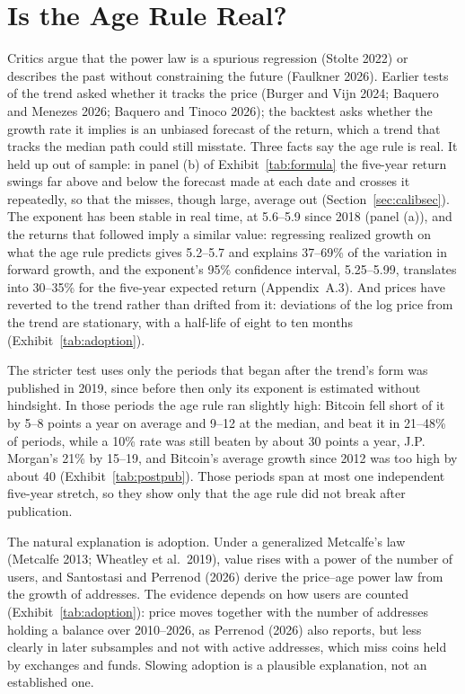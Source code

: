 \documentclass[12pt]{article}
\theoremstyle{plain}
\theoremstyle{remark}
\begin{document}
\section{Is the Age Rule Real?}\label{sec:formula}

Critics argue that the power law is a spurious regression (Stolte 2022) or describes the past without constraining the future (Faulkner 2026). Earlier tests of the trend asked whether it tracks the price (Burger and Vijn 2024; Baquero and Menezes 2026; Baquero and Tinoco 2026); the backtest asks whether the growth rate it implies is an unbiased forecast of the return, which a trend that tracks the median path could still misstate. Three facts say the age rule is real. It held up out of sample: in panel (b) of Exhibit~\ref{tab:formula} the five-year return swings far above and below the forecast made at each date and crosses it repeatedly, so that the misses, though large, average out (Section~\ref{sec:calibsec}). The exponent has been stable in real time, at 5.6--5.9 since 2018 (panel (a)), and the returns that followed imply a similar value: regressing realized growth on what the age rule predicts gives 5.2--5.7 and explains 37--69\% of the variation in forward growth, and the exponent's 95\% confidence interval, 5.25--5.99, translates into 30--35\% for the five-year expected return (Appendix~A.3). And prices have reverted to the trend rather than drifted from it: deviations of the log price from the trend are stationary, with a half-life of eight to ten months (Exhibit~\ref{tab:adoption}).

The stricter test uses only the periods that began after the trend's form was published in 2019, since before then only its exponent is estimated without hindsight. In those periods the age rule ran slightly high: Bitcoin fell short of it by 5--8 points a year on average and 9--12 at the median, and beat it in 21--48\% of periods, while a 10\% rate was still beaten by about 30 points a year, J.P. Morgan's 21\% by 15--19, and Bitcoin's average growth since 2012 was too high by about 40 (Exhibit~\ref{tab:postpub}). Those periods span at most one independent five-year stretch, so they show only that the age rule did not break after publication.

The natural explanation is adoption. Under a generalized Metcalfe's law (Metcalfe 2013; Wheatley et al.\ 2019), value rises with a power of the number of users, and Santostasi and Perrenod (2026) derive the price--age power law from the growth of addresses. The evidence depends on how users are counted (Exhibit~\ref{tab:adoption}): price moves together with the number of addresses holding a balance over 2010--2026, as Perrenod (2026) also reports, but less clearly in later subsamples and not with active addresses, which miss coins held by exchanges and funds. Slowing adoption is a plausible explanation, not an established one.
\end{document}

